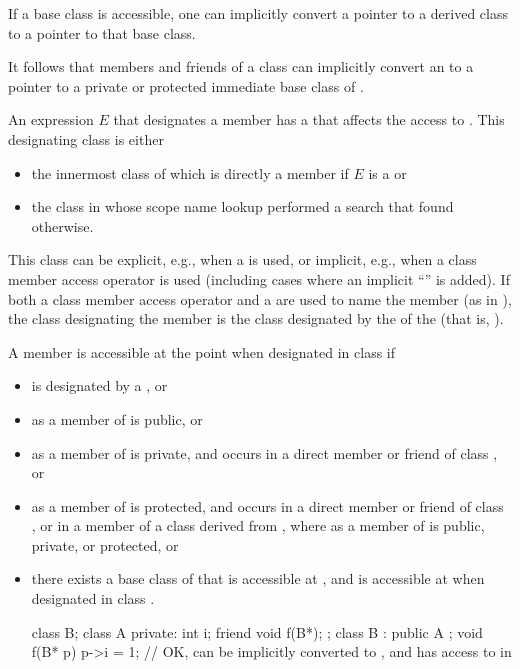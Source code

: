 \pnum
If a base class is accessible, one can implicitly convert a pointer to
a derived class to a pointer to that base class.
\begin{note}
It follows that
members and friends of a class
can implicitly convert an
to a pointer to a private or protected immediate base class of
.
\end{note}
An expression $E$ that designates a member 
has a 
that affects the access to .
This designating class is either
\begin{itemize}
\item
the innermost class of which  is directly a member
if $E$ is a  or
\item
the class in whose scope name lookup performed a search
that found  otherwise.
\end{itemize}
\begin{note}
This class can be explicit, e.g., when a
is used, or implicit, e.g., when a class member access operator is used (including cases where an implicit
``''
is
added).
If both a class member access operator and a
are used to name the member (as in
),
the class designating the member is the class designated by the
of the
(that is,
).
\end{note}
A member
is accessible at the point
when designated in class
if
\begin{itemize}
\item
{} is designated by a , or
\item
{}
as a member of
is public, or
\item
{}
as a member of
is private, and
occurs in a direct member or friend of class
,
or
\item
{}
as a member of
is protected, and
occurs in a direct member or friend of class
,
or in a member of a class
derived from
,
where
as a member of
is public, private, or protected, or
\item
there exists a base class
of
that is accessible at
,
and
is accessible at
when designated in class
.
\begin{example}
\begin{codeblock}
class B;
class A {
private:
  int i;
  friend void f(B*);
};
class B : public A { };
void f(B* p) {
  p->i = 1;         // OK,  can be implicitly converted to , and  has access to  in 
}
\end{codeblock}
\end{example}
\end{itemize}

